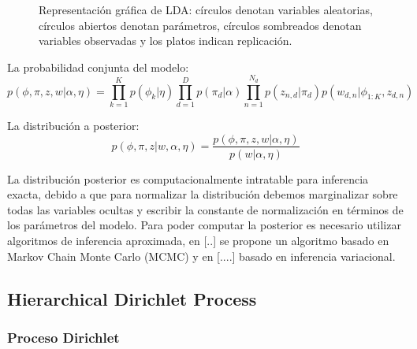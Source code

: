 \documentclass[letterpaper,12pt,oneside]{book} %
\begin{document}
\begin{figure}
  \centering
\caption{Representación gráfica de LDA: círculos denotan variables aleatorias, círculos abiertos denotan parámetros, círculos sombreados denotan variables observadas y los platos indican replicación.}
\label{img:lda}
\end{figure}

La probabilidad conjunta del modelo:
\begin{equation}
    p(\phi, \pi, z, w|\alpha, \eta)= \prod_{k=1}^{K}p(\phi_{k}|\eta)\prod_{d=1}^{D}p(\pi_{d}|\alpha)\prod_{n=1}^{N_{d}}p(z_{n,d}|\pi_{d})p(w_{d,n}|\phi_{1:K}, z_{d,n})
\end{equation}

La distribución a posterior:
\begin{equation}
    p(\phi, \pi, z|w, \alpha, \eta) = \frac{p(\phi, \pi, z, w|\alpha, \eta)}{p(w|\alpha, \eta)}
\end{equation}

La distribución posterior es computacionalmente intratable para inferencia exacta, debido a que para normalizar la distribución debemos marginalizar sobre todas las variables ocultas y escribir la constante de normalización en términos de los parámetros del modelo. Para poder computar la posterior es necesario utilizar algoritmos de inferencia aproximada, en [..] se propone un algoritmo basado en Markov Chain Monte Carlo (MCMC) y en [....] basado en inferencia variacional.

\subsection{Hierarchical Dirichlet Process}
\subsubsection{Proceso Dirichlet}
\end{document}
